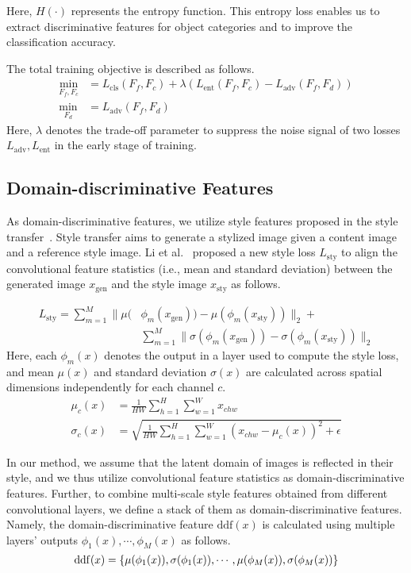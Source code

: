 \documentclass[letterpaper]{article} \usepackage{aaai20}  \usepackage{times}  \usepackage{helvet} \usepackage{courier}  \usepackage[hyphens]{url}  \usepackage{graphicx} \urlstyle{rm} \def\UrlFont{\rm}  \usepackage{graphicx}  \usepackage[whole]{bxcjkjatype}
\begin{document}
Here, $H(\cdot)$ represents the entropy function. This entropy loss enables us to extract discriminative features for object categories and to improve the classification accuracy.\par
The total training objective is described as follows.
\begin{align}
    \min_{F_f,F_c}&=L_{\mathrm{cls}}(F_f,F_c)+\lambda(L_{\mathrm{ent}}(F_f,F_c)-L_{\mathrm{adv}}(F_f,F_d))\nonumber\\
    \min_{F_d}&=L_{\mathrm{adv}}(F_f,F_d)
    \label{eq:total}
\end{align}
Here, $\lambda$ denotes the trade-off parameter to suppress the noise signal of two losses $L_{\mathrm{adv}}, L_{\mathrm{ent}}$ in the early stage of training.

\subsection{Domain-discriminative Features}
As domain-discriminative features, we utilize style features proposed in the style transfer~\cite{Gatys,Li,AdaIN}. Style transfer aims to generate a stylized image given a content image and a reference style image.
Li et al.~\cite{Li} proposed a new style loss $L_\mathrm{sty}$ to align the convolutional feature statistics (i.e., mean and standard deviation) between the generated image $x_\mathrm{gen}$ and the style image $x_{\mathrm{sty}}$ as follows.

\begin{equation}
\begin{split}
L_\mathrm{sty}=\sum_{m=1}^M\|\mu(&\phi_m(x_\mathrm{gen}))-\mu(\phi_m(x_\mathrm{sty}))\|_2+\\
&\sum_{m=1}^M\|\sigma(\phi_m(x_\mathrm{gen}))-\sigma(\phi_m(x_\mathrm{sty}))\|_2
\end{split}
\end{equation}
Here, each $\phi_m(x)$ denotes the output in a layer used to compute the style loss, and mean $\mu(x)$ and standard deviation $\sigma(x)$ are calculated across spatial dimensions independently for each channel $c$.
\begin{align}
\mu_{c}(x)&=\frac{1}{HW}\sum_{h=1}^{H}\sum_{w=1}^Wx_{chw}\\
\sigma_{c}(x)&=\sqrt{\frac{1}{HW}\sum_{h=1}^{H}\sum_{w=1}^{W}(x_{chw}-\mu_{c}(x))^2+\epsilon}
\end{align}\par
In our method, we assume that the latent domain of images is reflected in their style, and we thus utilize convolutional feature statistics as domain-discriminative features. Further, to combine multi-scale style features obtained from different convolutional layers, we define a stack of them as domain-discriminative features.
Namely, the domain-discriminative feature $\mathrm{ddf}(x)$ is calculated using multiple layers' outputs $\phi_1(x),\cdots,\phi_M(x)$ as follows.
\begin{equation}
\scalebox{0.98}{$
\mathrm{ddf}(x)=\{\mu(\phi_1(x)),\sigma(\phi_1(x)),\cdots,\mu(\phi_M(x)),\sigma(\phi_M(x))\}
$}
\label{eq:feature}
\end{equation}
\end{document}
